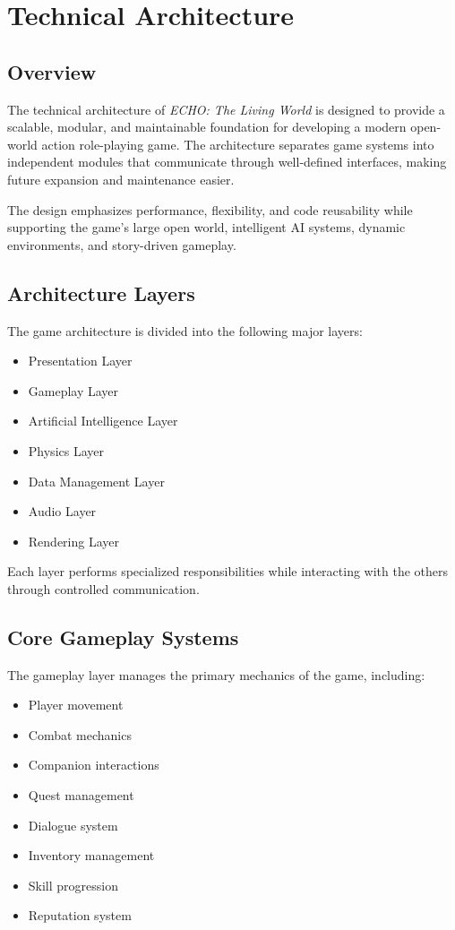 \chapter{Technical Architecture}

\section{Overview}

The technical architecture of \textit{ECHO: The Living World} is designed to provide a scalable, modular, and maintainable foundation for developing a modern open-world action role-playing game. The architecture separates game systems into independent modules that communicate through well-defined interfaces, making future expansion and maintenance easier.

The design emphasizes performance, flexibility, and code reusability while supporting the game's large open world, intelligent AI systems, dynamic environments, and story-driven gameplay.

\section{Architecture Layers}

The game architecture is divided into the following major layers:

\begin{itemize}
    \item Presentation Layer
    \item Gameplay Layer
    \item Artificial Intelligence Layer
    \item Physics Layer
    \item Data Management Layer
    \item Audio Layer
    \item Rendering Layer
\end{itemize}

Each layer performs specialized responsibilities while interacting with the others through controlled communication.

\section{Core Gameplay Systems}

The gameplay layer manages the primary mechanics of the game, including:

\begin{itemize}
    \item Player movement
    \item Combat mechanics
    \item Companion interactions
    \item Quest management
    \item Dialogue system
    \item Inventory management
    \item Skill progression
    \item Reputation system
\end{itemize}

